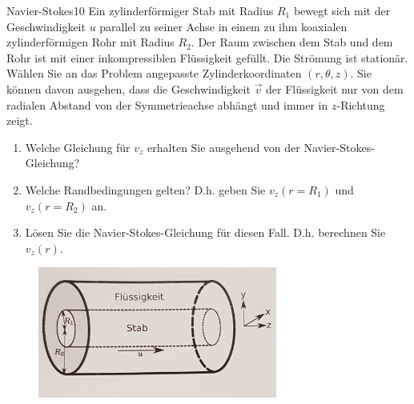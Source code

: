 \begin{exercise}{Navier-Stokes}{10}
  Ein zylinderförmiger Stab mit Radius $R_1$ bewegt sich mit der Geschwindigkeit $u$
  parallel zu seiner Achse in einem zu ihm koaxialen zylinderförmigen Rohr mit Radius
  $R_2$. Der Raum zwischen dem Stab und dem Rohr ist mit einer inkompressiblen
  Flüssigkeit gefüllt. Die Strömung ist stationär.\\
  Wählen Sie an das Problem angepasste Zylinderkoordinaten $(r, \theta, z)$. Sie
  können davon ausgehen, dass die Geschwindigkeit $\vec{v}$ der Flüssigkeit nur von
  dem radialen Abstand von der Symmetrieachse abhängt und immer in $z$-Richtung zeigt.

  \begin{enumerate}
    \item Welche Gleichung für $v_z$ erhalten Sie ausgehend von der Navier-Stokes-Gleichung?
    \item Welche Randbedingungen gelten? D.h. geben Sie $v_z(r = R_1)$ und $v_z(r = R_2)$ an.
    \item Lösen Sie die Navier-Stokes-Gleichung für diesen Fall. D.h. berechnen Sie $v_z(r)$.
  \end{enumerate}
  
  \begin{figure}[h]
    \centering
    \includegraphics[width=0.7\textwidth]{Skizze_Navier_Stokes.jpg}
    \label{fig:Skizze_Koaxial}
  \end{figure}

\end{exercise}
